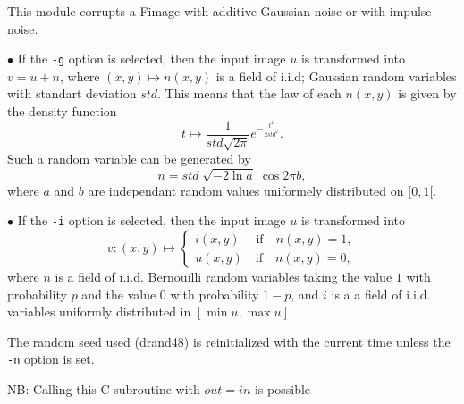 This module corrupts a Fimage with additive Gaussian noise
or with impulse noise. 

\medskip

$\bullet$ If the \verb+-g+ option is selected, then the
input image $u$ is transformed into $v = u+n$, where $(x,y)\mapsto n(x,y)$
is a field of i.i.d; Gaussian random variables with standart deviation
$std$. This means that the law of each $n(x,y)$ is given by the density
function 
$$t\mapsto \frac{1}{std \sqrt{2 \pi}} e^{-\frac{t^2}{2 std ^2}}.$$
Such a random variable can be generated by
$$n = std \; \sqrt{-2\ln a} \; \cos 2\pi b,$$
where $a$ and $b$ are independant random values uniformely distributed on
$[0,1[$.


\medskip 

$\bullet$ If the \verb+-i+ option is selected, then the
input image $u$ is transformed into 
$$v : (x,y) \mapsto \left\{ \begin{array}{l}
i(x,y) \;\quad\mbox{if}\quad n(x,y)=1,\\
u(x,y) \quad\mbox{if}\quad n(x,y)=0,
\end{array} \right.$$
where $n$ is a field of i.i.d. Bernouilli random variables taking 
the value $1$ with probability $p$ and the value $0$ with probability $1-p$,
and $i$ is a a field of i.i.d. variables uniformly distributed
in $[\min u, \max u]$.

\medskip

The random seed used ({\sf drand48}) is reinitialized with the current time
unless the \verb+-n+ option is set.

\medskip

NB: Calling this C-subroutine with $out=in$ is possible 
